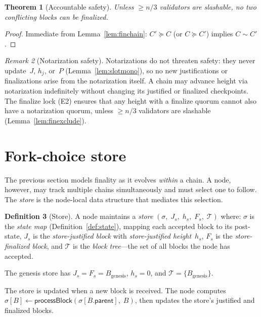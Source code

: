 \ifx\litemode\undefined\documentclass{article}\fi
\theoremstyle{plain}
\newtheorem{theorem}{Theorem}
\theoremstyle{definition}
\newtheorem{definition}[theorem]{Definition}
\theoremstyle{remark}
\newtheorem{remark}[theorem]{Remark}
\begin{document}
\begin{theorem}[Accountable safety]\label{thm:safety}
Unless $\geq n/3$ validators are slashable, no two conflicting blocks can be finalized.
\end{theorem}

\begin{proof}
Immediate from Lemma~\ref{lem:finchain}: $C' \succeq C$ (or $C \succeq C'$) implies $C \sim C'$.
\end{proof}

\begin{remark}[Notarization safety]\label{rem:notarization-safety}
Notarizations do not threaten safety: they never update~$J$, $h_j$, or~$P$ (Lemma~\ref{lem:slotmono}), so no new justifications or finalizations arise from the notarization itself.
A chain may advance height via notarization indefinitely without changing its justified or finalized checkpoints.
The finalize lock (E2) ensures that any height with a finalize quorum cannot also have a notarization quorum, unless $\geq n/3$ validators are slashable (Lemma~\ref{lem:finexclude}).
\end{remark}


\section{Fork-choice store}

The previous section models finality as it evolves \emph{within} a chain.
A node, however, may track multiple chains simultaneously and must select one to follow.
The \emph{store} is the node-local data structure that mediates this selection.

\begin{definition}[Store]\label{def:store}
A node maintains a \emph{store} $(\sigma,\; J_s,\; h_s,\; F_s,\; \mathcal{T})$ where:
$\sigma$ is the \emph{state map} (Definition~\ref{def:state}), mapping each accepted block to its post-state,
$J_s$ is the \emph{store-justified block} with \emph{store-justified height}~$h_s$,
$F_s$ is the \emph{store-finalized block},
and $\mathcal{T}$ is the \emph{block tree}---the set of all blocks the node has accepted.

The genesis store has $J_s = F_s = B_{\mathrm{genesis}}$, $h_s = 0$, and $\mathcal{T} = \{B_{\mathrm{genesis}}\}$.
\end{definition}

The store is updated when a new block is received.
The node computes $\sigma[B] \gets \textsf{processBlock}(\sigma[B.\mathsf{parent}],\; B)$, then updates the store's justified and finalized blocks.
\end{document}
